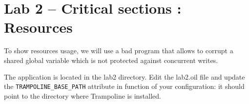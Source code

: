 \documentclass[11pt]{report}
\newtheorem{ex}{Question}
\begin{document}
%
%
%
%
%
%
%
\chapter{Lab 2 -- Critical sections : Resources}

To show resources usage, we will use a bad program that allows to corrupt a shared global variable which is not protected against concurrent writes. 

The application is located in the lab2 directory. Edit the lab2.oil file and update the \texttt{TRAMPOLINE\_BASE\_PATH} attribute in function of your configuration: it should point to the directory where Trampoline is installed.


\end{document}
